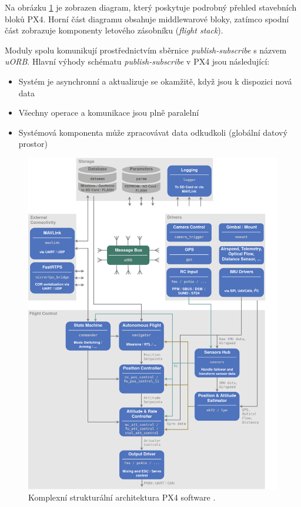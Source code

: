 Na obrázku \ref{fig:PX4_Arch} je zobrazen diagram, který poskytuje podrobný přehled stavebních bloků PX4. Horní část diagramu obsahuje middlewarové bloky, zatímco spodní část zobrazuje komponenty letového zásobníku (\textit{flight stack}).

Moduly spolu komunikují prostřednictvím sběrnice \textit{publish-subscribe} s názvem \textit{uORB}. Hlavní výhody schématu \textit{publish-subscribe} v PX4 jsou následující:

\begin{itemize}
    \item Systém je asynchronní a aktualizuje se okamžitě, když jsou k dispozici nová data
    \item Všechny operace a komunikace jsou plně paralelní
    \item Systémová komponenta může zpracovávat data odkudkoli (globální datový prostor)
\end{itemize}

\begin{figure}[!ht]
    \begin{center}
        \includegraphics[scale=0.45]{obrazky/PX41}
    \end{center}
    \caption[Komplexní strukturální architektura PX4 software]{Komplexní strukturální architektura PX4 software \cite{PX4main}.}
    \label{fig:PX4_Arch}
\end{figure}

